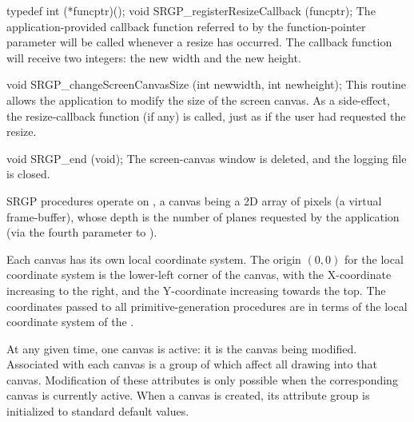 \nextsynopsis
typedef int (*funcptr)();
void SRGP_registerResizeCallback (funcptr);
\endsynopsis
The application-provided callback function referred to by the function-pointer
parameter will be called whenever a resize has occurred.  The callback function
will receive two integers:  the new width and the new height.


\nextsynopsis
void SRGP_changeScreenCanvasSize (int newwidth, int newheight);
\endsynopsis
This routine allows the application to modify the size of the screen canvas.
As a side-effect, the resize-callback function (if any) is called, just as if
the user had requested the resize.





\nextsynopsis
void SRGP_end (void);
\endsynopsis
The screen-canvas window is deleted,  and the logging file is closed.  


SRGP procedures operate on , a canvas being a 2D array of pixels
(a virtual frame-buffer), whose depth is the number of planes requested by the
application (via the fourth parameter to ).

\newpar
Each canvas has its own local coordinate system.  The origin $(0,0)$ for the
local coordinate system is the lower-left corner of the canvas, with the
X-coordinate increasing to the right, and the Y-coordinate increasing towards
the top.  The coordinates passed to all primitive-generation procedures are in
terms of the local coordinate system of the .

\newpar
At any given time, one canvas is active: it is the canvas being modified.
Associated with each canvas is a group of
 which affect all drawing into that canvas.  Modification of
these attributes is only possible when the corresponding canvas is currently
active.  When a canvas is created, its attribute group is initialized to
standard default values.


